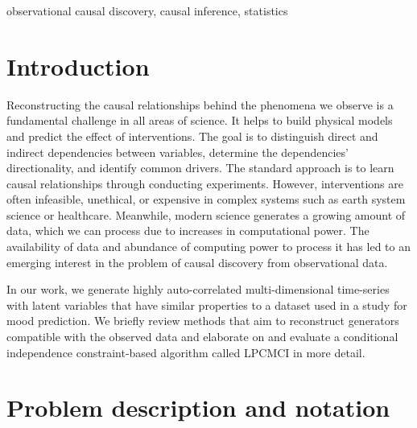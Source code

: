 \documentclass[conference]{IEEEtran}
\begin{document}
\begin{IEEEkeywords}
observational causal discovery, causal inference, statistics
\end{IEEEkeywords}

\section{Introduction}
Reconstructing the causal relationships behind the phenomena we observe is a fundamental challenge in all areas of science. It helps to build physical models and predict the effect of interventions\cite{pearl_book_2018}.
The goal is to distinguish direct and indirect dependencies between variables, determine the dependencies' directionality, and identify common drivers.
The standard approach is to learn causal relationships through conducting experiments. However, interventions are often infeasible, unethical, or expensive in complex systems such as earth system science or healthcare\cite{mcelreath_statistical_2018}.
Meanwhile, modern science generates a growing amount of data, which we can process due to increases in computational power.
The availability of data and abundance of computing power to process it has led to an emerging interest in the problem of causal discovery from observational data\cite{runge_causal_2018}.

In our work, we generate highly auto-correlated multi-dimensional time-series with latent variables that have similar properties to a dataset used in a study for mood prediction\cite{reiser_predicting_2022}. We briefly review methods that aim to reconstruct generators compatible with the observed data and elaborate on and evaluate a conditional independence constraint-based algorithm called LPCMCI\cite{gerhardus_high-recall_2021} in more detail.


\section{Problem description and notation}
\end{document}
